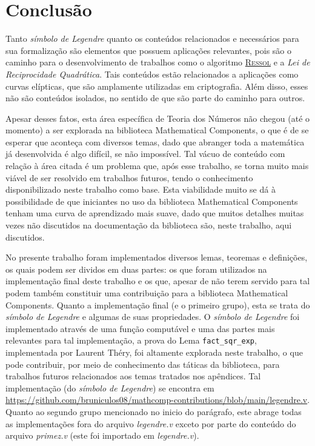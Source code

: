 \chapter{Conclusão}
\label{cap:conclusao}

Tanto \textit{símbolo de Legendre} quanto os conteúdos relacionados e necessários para sua formalização são elementos que possuem aplicações relevantes, pois são o caminho para o desenvolvimento de trabalhos como o algoritmo \hyperref[algo:ressol]{\textsc{Ressol}} e a \textit{Lei de Reciprocidade Quadrática}. Tais conteúdos estão relacionados a aplicações como curvas elípticas, que são amplamente utilizadas em criptografia. Além disso, esses não são conteúdos isolados, no sentido de que são parte do caminho para outros.

Apesar desses fatos, esta área específica de Teoria dos Números não chegou (até o momento) a ser explorada na biblioteca Mathematical Components, o que é de se esperar que aconteça com diversos temas, dado que abranger toda a matemática já desenvolvida é algo difícil, se não impossível. Tal vácuo de conteúdo com relação à área citada é um problema que, após esse trabalho, se torna muito mais viável de ser resolvido em trabalhos futuros, tendo o conhecimento disponibilizado neste trabalho como base. Esta viabilidade muito se dá à possibilidade de que iniciantes no uso da biblioteca Mathematical Components tenham uma curva de aprendizado mais suave, dado que muitos detalhes muitas vezes não discutidos na documentação da biblioteca são, neste trabalho, aqui discutidos.


No presente trabalho foram implementados diversos lemas, teoremas e definições, os quais podem ser dividos em duas partes: os que foram utilizados na implementação final deste trabalho e os que, apesar de não terem servido para tal podem também constituir uma contribuição para a biblioteca Mathematical Components. 
Quanto a implementação final (e o primeiro grupo), esta se trata do \textit{símbolo de Legendre} e algumas de suas propriedades. O \textit{símbolo de Legendre} foi implementado através de uma função computável e uma das partes mais relevantes para tal implementação, a prova do Lema \lstinline[language=coq]|fact_sqr_exp|, implementada por Laurent Théry, foi altamente explorada neste trabalho, o que pode contribuir, por meio de conhecimento das táticas da biblioteca, para trabalhos futuros relacionados aos temas tratados nos apêndices. Tal implementação (do \textit{símbolo de Legendre}) se encontra em \url{https://github.com/bruniculos08/mathcomp-contributions/blob/main/legendre.v}. Quanto ao segundo grupo mencionado no inicio do parágrafo, este abrage todas as implementações fora do arquivo \textit{legendre.v} exceto por parte do conteúdo do arquivo \textit{primez.v} (este foi importado em \textit{legendre.v}).

